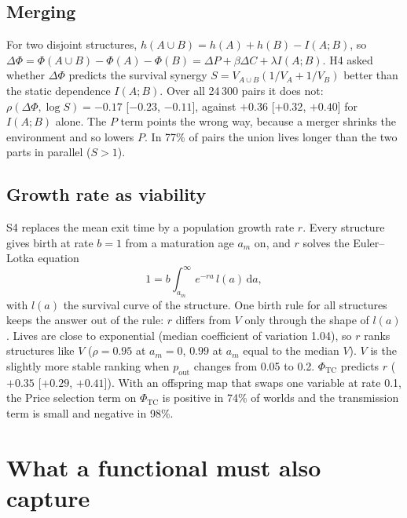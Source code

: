 \documentclass[11pt]{article}
\newcommand{\PhiTC}{\Phi_{\mathrm{TC}}}
\newcommand{\pout}{p_{\mathrm{out}}}
\begin{document}
\subsection{Merging}
\label{sec:merge}
For two disjoint structures, $h(A\cup B) = h(A) + h(B) - I(A;B)$, so
$\Delta\Phi = \Phi(A\cup B) - \Phi(A) - \Phi(B) = \Delta P + \beta\Delta C + \lambda I(A;B)$. H4 asked whether
$\Delta\Phi$ predicts the survival synergy $S = V_{A\cup B}(1/V_A + 1/V_B)$ better than the static dependence
$I(A;B)$. Over all 24\,300 pairs it does not: $\rho(\Delta\Phi, \log S) = -0.17$ [$-0.23$, $-0.11$], against $+0.36$
[$+0.32$, $+0.40$] for $I(A;B)$ alone. The $P$ term points the wrong way, because a merger shrinks the environment and
so lowers $P$. In 77\% of pairs the union lives longer than the two parts in parallel ($S>1$).

\subsection{Growth rate as viability}
S4 replaces the mean exit time by a population growth rate $r$. Every structure gives birth at rate $b=1$ from a
maturation age $a_m$ on, and $r$ solves the Euler--Lotka equation \cite{Lotka1907,Charlesworth94}
\begin{equation}
  1 = b\int_{a_m}^{\infty} e^{-ra}\,l(a)\,\mathrm{d}a ,
\end{equation}
with $l(a)$ the survival curve of the structure. One birth rule for all structures keeps the answer out of the rule:
$r$ differs from $V$ only through the shape of $l(a)$. Lives are close to exponential (median coefficient of variation
1.04), so $r$ ranks structures like $V$ ($\rho = 0.95$ at $a_m=0$, $0.99$ at $a_m$ equal to the median $V$). $V$ is the
slightly more stable ranking when $\pout$ changes from 0.05 to 0.2. $\PhiTC$ predicts $r$ ($+0.35$ [$+0.29$, $+0.41$]).
With an offspring map that swaps one variable at rate 0.1, the Price selection term on $\PhiTC$ is positive in 74\% of
worlds and the transmission term is small and negative in 98\%.

\section{What a functional must also capture}
\end{document}
